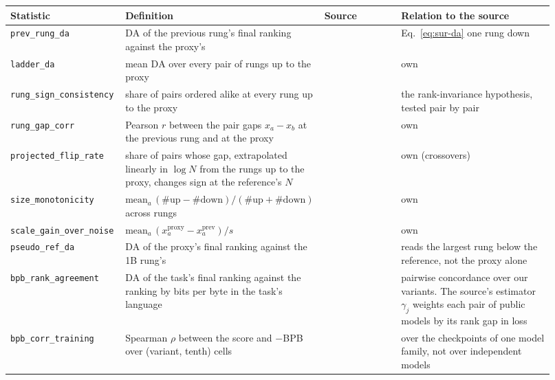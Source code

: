 \begin{table}[h]
\centering
\scriptsize
\begin{tabular}{@{}p{0.215\linewidth}p{0.28\linewidth}p{0.14\linewidth}p{0.285\linewidth}@{}}
\toprule
\textbf{Statistic} & \textbf{Definition} & \textbf{Source} & \textbf{Relation to the source} \\
\midrule
\texttt{prev\_rung\_da} & $\mathrm{DA}$ of the previous rung's final ranking against the proxy's & \citet{magnusson_datadecide_2025} & Eq.~\ref{eq:sur-da} one rung down \\
\texttt{ladder\_da} & mean $\mathrm{DA}$ over every pair of rungs up to the proxy & \citet{magnusson_datadecide_2025} & own \\
\texttt{rung\_sign\_consistency} & share of pairs ordered alike at every rung up to the proxy & \citet{liu_regmix_2025} & the rank-invariance hypothesis, tested pair by pair \\
\texttt{rung\_gap\_corr} & Pearson $r$ between the pair gaps $x_a - x_b$ at the previous rung and at the proxy & \citet{liu_regmix_2025} & own \\
\texttt{projected\_flip\_rate} & share of pairs whose gap, extrapolated linearly in $\log N$ from the rungs up to the proxy, changes sign at the reference's $N$ & \citet{magnusson_datadecide_2025} & own (crossovers) \\
\texttt{size\_monotonicity} & $\mathrm{mean}_a\,(\#\text{up} - \#\text{down})/(\#\text{up} + \#\text{down})$ across rungs & \citet{bhagia_establishing_2025} & own \\
\texttt{scale\_gain\_over\_noise} & $\mathrm{mean}_a\,(x_a^{\text{proxy}} - x_a^{\text{prev}})/s$ & \citet{bhagia_establishing_2025} & own \\
\texttt{pseudo\_ref\_da} & $\mathrm{DA}$ of the proxy's final ranking against the 1B rung's & \citet{magnusson_datadecide_2025, liu_regmix_2025} & reads the largest rung below the reference, not the proxy alone \\
\midrule
\texttt{bpb\_rank\_agreement} & $\mathrm{DA}$ of the task's final ranking against the ranking by bits per byte in the task's language & \citet{thrush_improving_2025} & pairwise concordance over our variants. The source's estimator $\gamma_j$ weights each pair of public models by its rank gap in loss \\
\texttt{bpb\_corr\_training} & Spearman $\rho$ between the score and $-$BPB over (variant, tenth) cells & \citet{thrush_improving_2025, brandfonbrener_loss--loss_2024} & over the checkpoints of one model family, not over independent models \\

\end{tabular}
\end{table}
